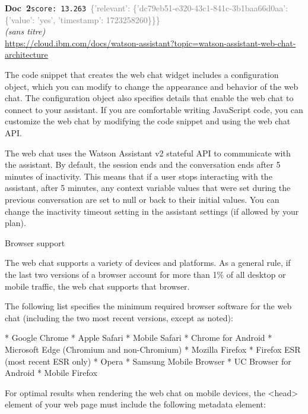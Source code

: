 \documentclass[a4paper,11pt]{article}
\begin{document}
\begin{docenv}
{\footnotesize\textcolor{doccolor}{\textbf{Doc~2}}}\hfill{\tiny\texttt{score:~13.263}}\ {\tiny\textcolor{gray}{\{'relevant': \{'dc79eb51-e320-43c1-841c-3b1baa66d0aa': \{'value': 'yes', 'timestamp': 1723258260\}\}\}}}\\[3pt]
{\small\textit{(sans titre)}}\\[2pt]
{\tiny\url{https://cloud.ibm.com/docs/watson-assistant?topic=watson-assistant-web-chat-architecture}}\\[4pt]
{\footnotesize 
The code snippet that creates the web chat widget includes a configuration object, which you can modify to change the appearance and behavior of the web chat. The configuration object also specifies details that enable the web chat to connect to your assistant. If you are comfortable writing JavaScript code, you can customize the web chat by modifying the code snippet and using the web chat API.

The web chat uses the Watson Assistant v2 stateful API to communicate with the assistant. By default, the session ends and the conversation ends after 5 minutes of inactivity. This means that if a user stops interacting with the assistant, after 5 minutes, any context variable values that were set during the previous conversation are set to null or back to their initial values. You can change the inactivity timeout setting in the assistant settings (if allowed by your plan).



 Browser support 

The web chat supports a variety of devices and platforms. As a general rule, if the last two versions of a browser account for more than 1\% of all desktop or mobile traffic, the web chat supports that browser.

The following list specifies the minimum required browser software for the web chat (including the two most recent versions, except as noted):



* Google Chrome
* Apple Safari
* Mobile Safari
* Chrome for Android
* Microsoft Edge (Chromium and non-Chromium)
* Mozilla Firefox
* Firefox ESR (most recent ESR only)
* Opera
* Samsung Mobile Browser
* UC Browser for Android
* Mobile Firefox



For optimal results when rendering the web chat on mobile devices, the <head> element of your web page must include the following metadata element:

}
\end{docenv}
\end{document}
